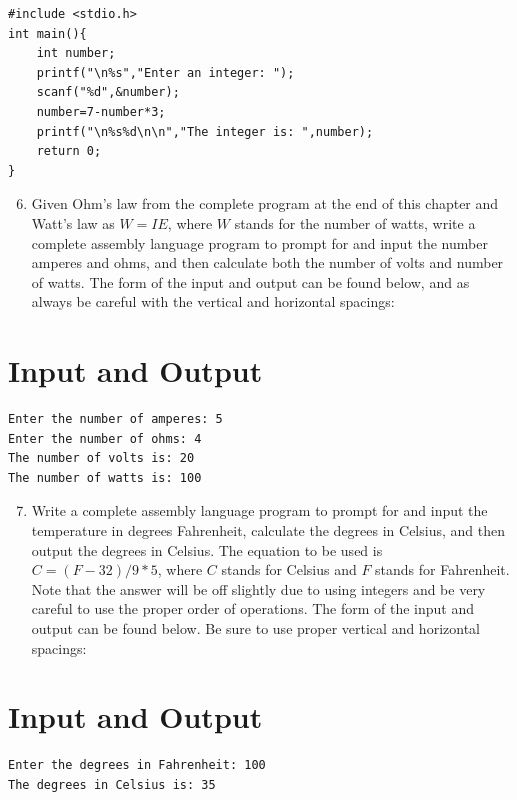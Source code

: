 \documentclass[10pt]{book}
\begin{document}
\begin{verbatim}
#include <stdio.h>
int main(){
    int number;
    printf("\n%s","Enter an integer: ");
    scanf("%d",&number);
    number=7-number*3;
    printf("\n%s%d\n\n","The integer is: ",number);
    return 0;
}
\end{verbatim}

\begin{enumerate}
  \setcounter{enumi}{5}
  \item Given Ohm's law from the complete program at the end of this chapter and Watt's law as $W=I E$, where $W$ stands for the number of watts, write a complete assembly language program to prompt for and input the number amperes and ohms, and then calculate both the number of volts and number of watts. The form of the input and output can be found below, and as always be careful with the vertical and horizontal spacings:
\end{enumerate}

\section{Input and Output}
\begin{verbatim}
Enter the number of amperes: 5
Enter the number of ohms: 4
The number of volts is: 20
The number of watts is: 100
\end{verbatim}

\begin{enumerate}
  \setcounter{enumi}{6}
  \item Write a complete assembly language program to prompt for and input the temperature in degrees Fahrenheit, calculate the degrees in Celsius, and then output the degrees in Celsius. The equation to be used is $C=(F-32)/9*5$, where $C$ stands for Celsius and $F$ stands for Fahrenheit. Note that the answer will be off slightly due to using integers and be very careful to use the proper order of operations. The form of the input and output can be found below. Be sure to use proper vertical and horizontal spacings:
\end{enumerate}

\section{Input and Output}
\begin{verbatim}
Enter the degrees in Fahrenheit: 100
The degrees in Celsius is: 35
\end{verbatim}
\end{document}
